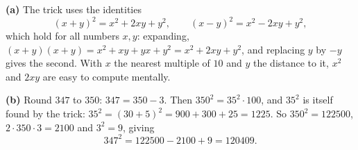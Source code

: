 \textbf{(a)} The trick uses the identities
\[(x+y)^2=x^2+2xy+y^2,\qquad(x-y)^2=x^2-2xy+y^2,\]
which hold for all numbers $x,y$: expanding, $(x+y)(x+y)=x^2+xy+yx+y^2=x^2+2xy+y^2$, and replacing $y$ by $-y$ gives the second. With $x$ the nearest multiple of $10$ and $y$ the distance to it, $x^2$ and $2xy$ are easy to compute mentally.

\textbf{(b)} Round $347$ to $350$: $347=350-3$. Then $350^2=35^2\cdot100$, and $35^2$ is itself found by the trick: $35^2=(30+5)^2=900+300+25=1225$. So $350^2=122500$, $2\cdot350\cdot3=2100$ and $3^2=9$, giving
\[347^2=122500-2100+9=\boxed{120409}.\]
